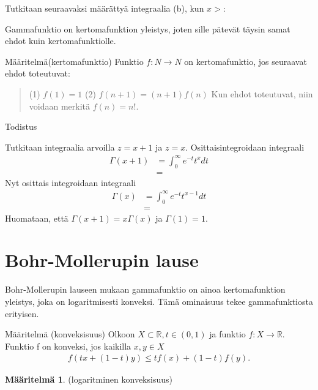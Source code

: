 \documentclass[12pt]{article}
\theoremstyle{definition}
\newtheorem{maar}{Määritelmä}
\theoremstyle{plain}
\begin{document}
Tutkitaan seuraavaksi määrättyä integraalia (b), kun $x>$: \newline


Gammafunktio on kertomafunktion yleistys, joten sille pätevät täysin samat ehdot kuin kertomafunktiolle. 

Määritelmä(kertomafunktio) \newline
Funktio $f: N \rightarrow N$ on kertomafunktio, jos seuraavat ehdot toteutuvat:


\begin{quote}
    (1) $f(1)=1$ \newline
    (2) $f(n+1)=(n+1)f(n)$ \newline
    Kun ehdot toteutuvat, niin voidaan merkitä $f(n)=n!$.
\end{quote}
Todistus \newline

Tutkitaan integraalia arvoilla $z=x+1$ ja $z=x$. \newline
Osittaisintegroidaan integraali
\begin{align*}
    \Gamma(x+1) & = \int_{0}^{\infty} e^{-t} t^{x} dt \\
    & = 
\end{align*}
Nyt osittais integroidaan integraali \newline
\begin{align*}
    \Gamma(x) & = \int_{0}^{\infty} e^{-t} t^{x-1} dt \\
& =
\end{align*}
Huomataan, että $\Gamma(x+1) = x\Gamma(x)$ ja $\Gamma(1) = 1.$ \newline
\newpage




\section{Bohr-Mollerupin lause}
\onehalfspacing
Bohr-Mollerupin lauseen mukaan gammafunktio on ainoa kertomafunktion yleistys, joka on logaritmisesti konveksi. Tämä ominaisuus tekee gammafunktiosta erityisen.
\newline

Määritelmä (konveksisuus)\newline
Olkoon $X \subset \mathbb{R}, t \in (0, 1)$ ja funktio $f: X \rightarrow \mathbb{R}$. Funktio f on konveksi, jos kaikilla $x,y \in X$
\begin{align}
    f(tx+(1-t)y) \le tf(x)+(1-t)f(y).
\end{align}


\begin{maar}
(logaritminen konveksisuus)
\end{maar}
\end{document}
